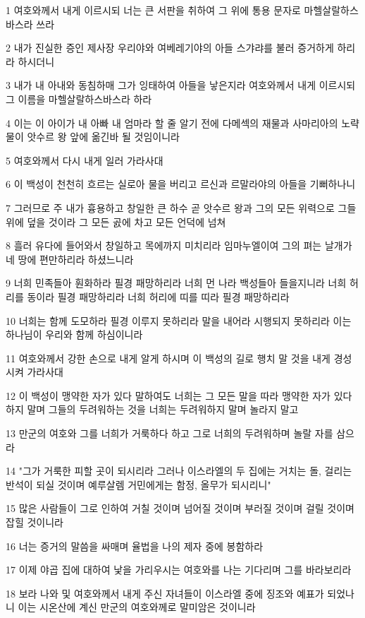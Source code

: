\par 1 여호와께서 내게 이르시되 너는 큰 서판을 취하여 그 위에 통용 문자로 마헬살랄하스바스라 쓰라
\par 2 내가 진실한 증인 제사장 우리야와 여베레기야의 아들 스갸랴를 불러 증거하게 하리라 하시더니
\par 3 내가 내 아내와 동침하매 그가 잉태하여 아들을 낳은지라 여호와께서 내게 이르시되 그 이름을 마헬살랄하스바스라 하라
\par 4 이는 이 아이가 내 아빠 내 엄마라 할 줄 알기 전에 다메섹의 재물과 사마리아의 노략물이 앗수르 왕 앞에 옮긴바 될 것임이니라
\par 5 여호와께서 다시 내게 일러 가라사대
\par 6 이 백성이 천천히 흐르는 실로아 물을 버리고 르신과 르말라야의 아들을 기뻐하나니
\par 7 그러므로 주 내가 흉용하고 창일한 큰 하수 곧 앗수르 왕과 그의 모든 위력으로 그들 위에 덮을 것이라 그 모든 곬에 차고 모든 언덕에 넘쳐
\par 8 흘러 유다에 들어와서 창일하고 목에까지 미치리라 임마누엘이여 그의 펴는 날개가 네 땅에 편만하리라 하셨느니라
\par 9 너희 민족들아 훤화하라 필경 패망하리라 너희 먼 나라 백성들아 들을지니라 너희 허리를 동이라 필경 패망하리라 너희 허리에 띠를 띠라 필경 패망하리라
\par 10 너희는 함께 도모하라 필경 이루지 못하리라 말을 내어라 시행되지 못하리라 이는 하나님이 우리와 함께 하심이니라
\par 11 여호와께서 강한 손으로 내게 알게 하시며 이 백성의 길로 행치 말 것을 내게 경성시켜 가라사대
\par 12 이 백성이 맹약한 자가 있다 말하여도 너희는 그 모든 말을 따라 맹약한 자가 있다 하지 말며 그들의 두려워하는 것을 너희는 두려워하지 말며 놀라지 말고
\par 13 만군의 여호와 그를 너희가 거룩하다 하고 그로 너희의 두려워하며 놀랄 자를 삼으라
\par 14 "그가 거룩한 피할 곳이 되시리라 그러나 이스라엘의 두 집에는 거치는 돌, 걸리는 반석이 되실 것이며 예루살렘 거민에게는 함정, 올무가 되시리니"
\par 15 많은 사람들이 그로 인하여 거칠 것이며 넘어질 것이며 부러질 것이며 걸릴 것이며 잡힐 것이니라
\par 16 너는 증거의 말씀을 싸매며 율법을 나의 제자 중에 봉함하라
\par 17 이제 야곱 집에 대하여 낯을 가리우시는 여호와를 나는 기다리며 그를 바라보리라
\par 18 보라 나와 및 여호와께서 내게 주신 자녀들이 이스라엘 중에 징조와 예표가 되었나니 이는 시온산에 계신 만군의 여호와께로 말미암은 것이니라
